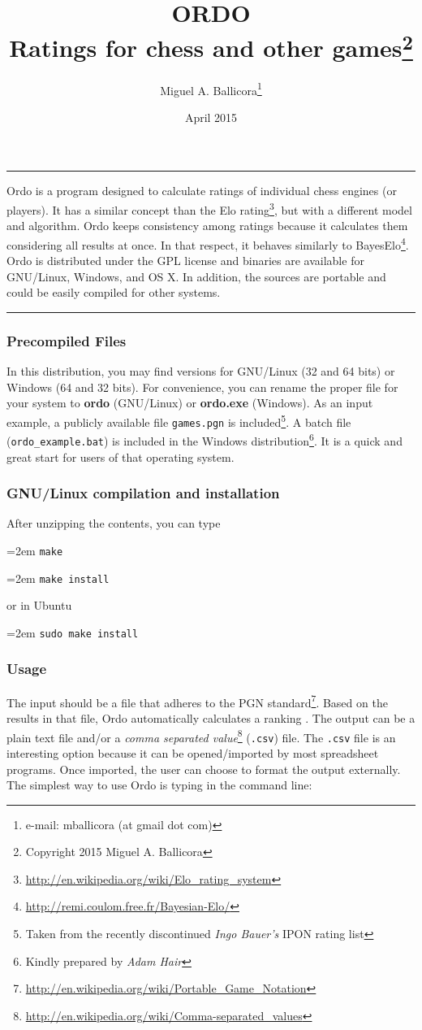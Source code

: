 \documentclass[12pt]{article}
\title{ORDO  \\ Ratings for chess and other games\footnote{Copyright \cpyrht{} 2015 Miguel A. Ballicora}}
\author{Miguel A. Ballicora\footnote{e-mail: mballicora (at gmail dot com)}}
\date{April 2015}
\renewenvironment{abstract}{%
\hfill\begin{minipage}{0.95\textwidth}
\rule{\textwidth}{1pt}}
{\par\noindent\rule{\textwidth}{1pt}\end{minipage}}
\newcommand{\rgstrd} {\textsuperscript{\textregistered{}}}
\newcommand{\person} [1] {\textit{#1}}
\newcommand{\filename} [1] {\texttt{#1}}
\newcommand{\cmdln}[1]{
	\par
	\begingroup
		\leftskip=2em
		\addtolength{\rightskip}{0em}
		\noindent \small{\texttt{#1}}
		\par
	\endgroup
}
\begin{document}
   \maketitle

\begin{abstract}
Ordo is a program designed to calculate ratings of individual chess engines (or players).
It has a similar concept than the Elo rating\footnote{\url{http://en.wikipedia.org/wiki/Elo_rating_system}}, but with a different model and algorithm. 
Ordo keeps consistency among ratings because it calculates them considering all results at once.
In that respect, it behaves similarly to BayesElo\footnote{\url{http://remi.coulom.free.fr/Bayesian-Elo/}}.
Ordo is distributed under the GPL license and binaries are available for GNU/Linux, Windows\rgstrd{}, and OS X.
In addition, the sources are portable and could be easily compiled for other systems. 
\end{abstract}

\subsubsection*{Precompiled Files}
In this distribution, you may find versions for GNU/Linux (32 and 64 bits) or Windows\rgstrd{} (64 and 32 bits). 
For convenience, you can rename the proper file for your system to \textbf{ordo} (GNU/Linux) or \textbf{ordo.exe} (Windows\rgstrd{}). 
As an input example, a publicly available file \filename{games.pgn} is included\footnote{Taken from the recently discontinued \person{Ingo Bauer's} IPON rating list}. 
A batch file (\filename{ordo\_example.bat}) is included in the Windows\rgstrd{} distribution\footnote{Kindly prepared by \person{Adam Hair}}. 
It is a quick and great start for users of that operating system.

\subsubsection*{GNU/Linux compilation and installation}
After unzipping the contents, you can type
\cmdln{make}
\cmdln{make install}
or in Ubuntu
\cmdln{sudo make install}

\subsubsection*{Usage}
The input should be a file that adheres to the PGN standard\footnote{\url{http://en.wikipedia.org/wiki/Portable_Game_Notation}}. 
Based on the results in that file, Ordo automatically calculates a ranking . 
The output can be a plain text file and/or a \textit{comma separated value}\footnote{\url{http://en.wikipedia.org/wiki/Comma-separated_values}} (\filename{.csv}) file.
The \filename{.csv} file is an interesting option because it can be opened/imported by most spreadsheet programs. 
Once imported, the user can choose to format the output externally.
The simplest way to use Ordo is typing in the command line:
\end{document}
